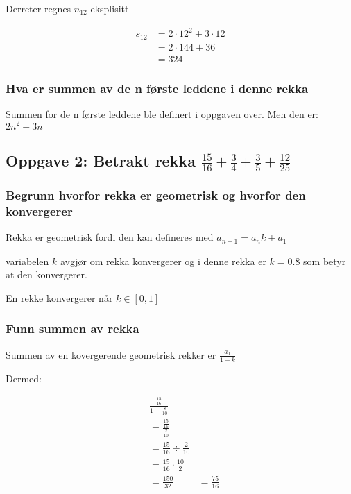 \documentclass{article}
\begin{document}
Derreter regnes $n_{12}$ eksplisitt

\begin{align*}
    s_{12} &= 2 \cdot 12^2 + 3 \cdot 12 \\
    &= 2 \cdot 144 + 36 \\
    &= 324
\end{align*}

\subsubsection{Hva er summen av de n første leddene i denne rekka}

Summen for de n første leddene ble definert i oppgaven over. Men den er: $2n^2 + 3n$

\subsection{Oppgave 2: Betrakt rekka $\frac{15}{16} + \frac{3}{4} + \frac{3}{5} + \frac{12}{25}$}

\subsubsection{Begrunn hvorfor rekka er geometrisk og hvorfor den konvergerer}

Rekka er geometrisk fordi den kan defineres med $a_{n+1}=a_n k + a_1$

variabelen $k$ avgjør om rekka konvergerer og i denne rekka er $k=0.8$ som betyr at den konvergerer.

En rekke konvergerer når $k \in [0, 1]$

\subsubsection{Funn summen av rekka}

Summen av en kovergerende geometrisk rekker er $\frac{a_1}{1-k}$

Dermed:

\begin{align*}
    & \frac{\frac{15}{16}}{1-\frac{8}{10}} \\
    &= \frac{\frac{15}{16}}{\frac{2}{10}} \\ 
    &= \frac{15}{16} \div \frac{2}{10} \\
    &= \frac{15}{16} \cdot \frac{10}{2} \\
    &= \frac{150}{32}
    &= \frac{75}{16}
\end{align*}
\end{document}

